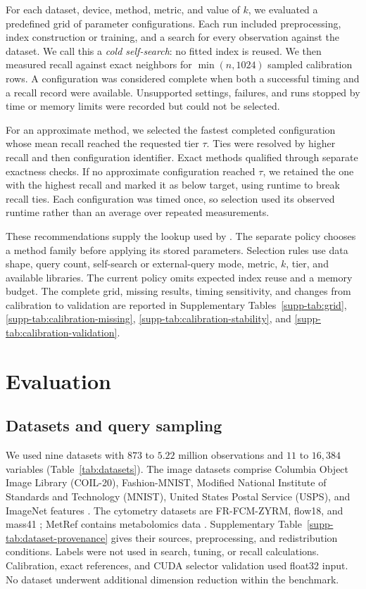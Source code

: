 \documentclass[article]{jss}
\begin{document}
For each dataset, device, method, metric, and value of $k$, we evaluated a
predefined grid of parameter configurations. Each run included preprocessing,
index construction or training, and a search for every observation against
the dataset. We call this a \emph{cold self-search}: no fitted index is reused.
We then measured recall against exact neighbors for $\min(n,1024)$ sampled
calibration rows. A configuration was considered complete when both a
successful timing and a recall record were available. Unsupported settings,
failures, and runs stopped by time or memory limits were recorded but could
not be selected.

For an approximate method, we selected the fastest completed configuration
whose mean recall reached the requested tier $\tau$. Ties were resolved by
higher recall and then configuration identifier. Exact methods qualified
through separate exactness checks. If no approximate configuration reached
$\tau$, we retained the one with the highest recall and marked it as below
target, using runtime to break recall ties. Each configuration was timed
once, so selection used its observed runtime rather than an average over
repeated measurements.

These recommendations supply the lookup used by .
The separate  policy chooses a method family before
applying its stored parameters. Selection rules use data shape, query count,
self-search or external-query mode, metric, $k$, tier, and available libraries.
The current policy omits expected index reuse and a memory budget. The complete
grid, missing results, timing sensitivity, and changes from calibration to
validation are reported in Supplementary Tables~\ref{supp-tab:grid},
\ref{supp-tab:calibration-missing}, \ref{supp-tab:calibration-stability}, and
\ref{supp-tab:calibration-validation}.

\section{Evaluation} \label{sec:evaluation}

\subsection{Datasets and query sampling}

We used nine datasets with $873$ to $5.22$ million observations and $11$ to
$16,384$ variables (Table~\ref{tab:datasets}). The image datasets comprise
Columbia Object Image Library (COIL-20), Fashion-MNIST, Modified National
Institute of Standards and Technology (MNIST), United States Postal Service
(USPS), and ImageNet features
\citep{Nene1996,Xiao2017,LeCun1998,YouShung2022,Hull1994,
Russakovsky2015,Oquab2024}. The cytometry datasets are FR-FCM-ZYRM, flow18,
and mass41 \citep{VanUnen2017,Belkina2019}; MetRef contains metabolomics data
\citep{Cacciatore2014}. Supplementary Table~\ref{supp-tab:dataset-provenance}
gives their sources, preprocessing, and redistribution conditions. Labels
were not used in search, tuning, or recall calculations. Calibration,
exact references, and CUDA selector validation used float32 input. No dataset
underwent additional dimension reduction within the benchmark.
\end{document}

